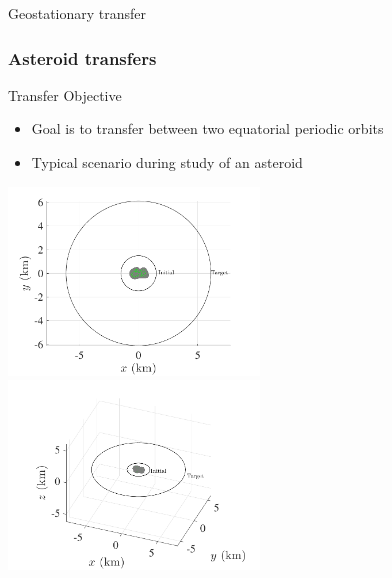 \begin{frame}{Geostationary  transfer}
\end{frame} %

\subsubsection*{Asteroid transfers}

\begin{frame}{Transfer Objective} %

\begin{itemize}
    \item Goal is to transfer between two equatorial periodic orbits
    \item Typical scenario during study of an asteroid
\end{itemize}

\begin{center}
    \includegraphics[width=0.5\textwidth,height=0.7\textheight,keepaspectratio]{figures/2016AAS/initial_transfer.pdf}~
    \includegraphics[width=0.5\textwidth,height=0.7\textheight,keepaspectratio]{figures/2016AAS/initial_transfer_3d.pdf}
\end{center}

\end{frame}%

